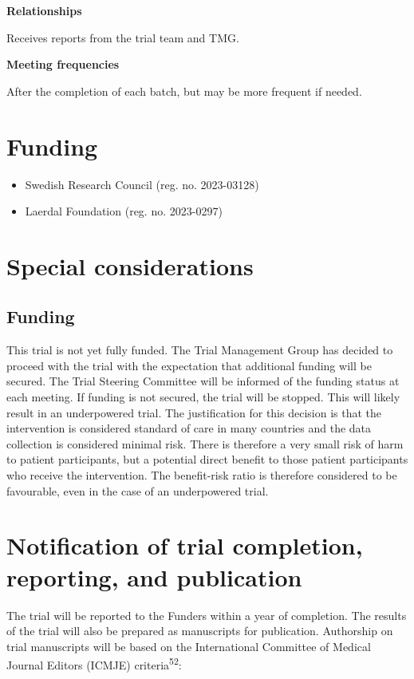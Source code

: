 \documentclass[
]{scrartcl}
\providecommand{\tightlist}{%
  \setlength{\itemsep}{0pt}\setlength{\parskip}{0pt}}\usepackage{longtable,booktabs,array}
\begin{document}
\textbf{Relationships}

Receives reports from the trial team and TMG.

\textbf{Meeting frequencies}

After the completion of each batch, but may be more frequent if needed.

\section{Funding}\label{funding}

\begin{itemize}
\tightlist
\item
  Swedish Research Council (reg. no. 2023-03128)
\item
  Laerdal Foundation (reg. no. 2023-0297)
\end{itemize}

\section{Special considerations}\label{special-considerations}

\subsection{Funding}\label{funding-1}

This trial is not yet fully funded. The Trial Management Group has
decided to proceed with the trial with the expectation that additional
funding will be secured. The Trial Steering Committee will be informed
of the funding status at each meeting. If funding is not secured, the
trial will be stopped. This will likely result in an underpowered trial.
The justification for this decision is that the intervention is
considered standard of care in many countries and the data collection is
considered minimal risk. There is therefore a very small risk of harm to
patient participants, but a potential direct benefit to those patient
participants who receive the intervention. The benefit-risk ratio is
therefore considered to be favourable, even in the case of an
underpowered trial.

\section{Notification of trial completion, reporting, and
publication}\label{notification-of-trial-completion-reporting-and-publication}

The trial will be reported to the Funders within a year of completion.
The results of the trial will also be prepared as manuscripts for
publication. Authorship on trial manuscripts will be based on the
International Committee of Medical Journal Editors (ICMJE)
criteria\textsuperscript{52}:
\end{document}
